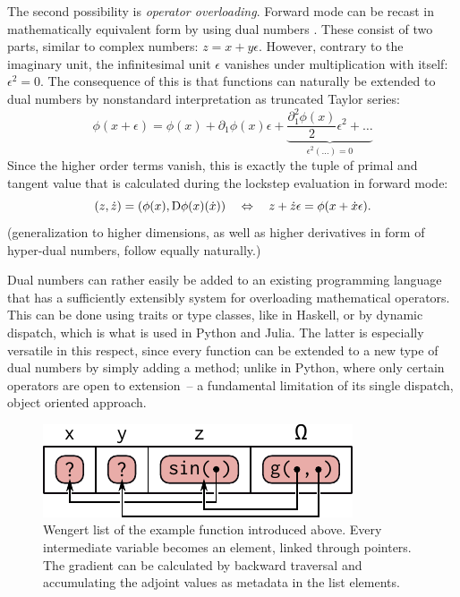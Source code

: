 The second possibility is \emph{operator overloading}.  Forward mode can be recast in mathematically
equivalent form by using dual numbers \parencite[see][section 3.1.1]{baydin2018automatic}.  These
consist of two parts, similar to complex numbers: \(z = x + y\epsilon\).  However, contrary to the
imaginary unit, the infinitesimal unit \(\epsilon\) vanishes under multiplication with itself:
\(\epsilon^2 = 0\).  The consequence of this is that functions can naturally be extended to dual
numbers by nonstandard interpretation as truncated Taylor series:
\begin{equation}
  \phi(x + \epsilon) = \phi(x) + \partial_1\phi(x)\epsilon + \underbrace{\frac{\partial^2_1\phi(x)}{2}\epsilon^2
  + \ldots}_{\epsilon^2 (\ldots) = 0}
\end{equation}
Since the higher order terms vanish, this is exactly the tuple of primal and tangent value that is
calculated during the lockstep evaluation in forward mode:
\begin{equation}
  (z, \dot{z}) = (\phi(x), \mathop{}\!\mathrm{D}\phi(x)(\dot{x})) \quad\Leftrightarrow\quad z + \dot{z}\epsilon = \phi(x + \dot{x}\epsilon).
\end{equation}
(generalization to higher dimensions, as well as higher derivatives in form of hyper-dual numbers,
follow equally naturally.)

Dual numbers can rather easily be added to an existing programming language that has a sufficiently
extensibly system for overloading mathematical operators.  This can be done using traits or type
classes, like in Haskell, or by dynamic dispatch, which is what is used in Python and Julia.  The
latter is especially versatile in this respect, since every function can be extended to a new type
of dual numbers by simply adding a method; unlike in Python, where only certain operators are open
to extension~-- a fundamental limitation of its single dispatch, object oriented approach.

\begin{figure}[t]
  \centering
  \includegraphics{figures/wengert-list}
  \caption{Wengert list of the example function \protect{} introduced above.
    Every intermediate variable becomes an element, linked through pointers.  The gradient can be
    calculated by backward traversal and accumulating the adjoint values as metadata in the list
    elements.}
  \label{fig:wengert-list}
\end{figure}

